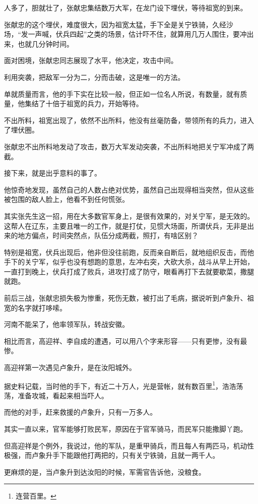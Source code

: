 \begin{multicols}{\theparacolNo}
		人多了，胆就壮了，张献忠集结数万大军，在龙门设下埋伏，等待祖宽的到来。

		张献忠的这个埋伏，难度很大，因为祖宽太猛，手下全是关宁铁骑，久经沙场，“发一声喊，伏兵四起”之类的场景，估计吓不住，就算用几万人围住，要冲出来，也就几分钟时间。

		面对困境，张献忠同志展现了水平，他决定，攻击中间。

		利用突袭，把敌军一分为二，分而击破，这是唯一的方法。

		单就质量而言，他的手下实在比较一般，但正如一位名人所说，有数量，就有质量，他集结了十倍于祖宽的兵力，开始等待。

		不出所料，祖宽出现了，依然不出所料，他没有丝毫防备，带领所有的兵力，进入了埋伏圈。

		张献忠不出所料地发动了攻击，数万大军发动突袭，不出所料地把关宁军冲成了两截。

		接下来，就是出乎意料的事了。

		他惊奇地发现，虽然自己的人数占绝对优势，虽然自己出现得相当突然，但从这些被包围的敌人脸上，他看不到任何慌张。

		其实张先生这一招，用在大多数官军身上，是很有效果的，对关宁军，是无效的。这帮人在辽东，主要且唯一的工作，就是打仗，见惯大场面，所谓伏兵，无非是出来的地方偏点，时间突然点，队伍分成两截，照打，有啥区别？

		特别是祖宽，伏兵出现后，他非但没往前跑，反而亲自断后，就地组织反击，而他手下的关宁军，似乎也没有想跑的意思，左冲右突，大砍大杀，战斗从早上开始，一直打到晚上，伏兵打成了败兵，进攻打成了防守，眼看再打下去就要歇菜，撒腿就跑。

		前后三战，张献忠损失极为惨重，死伤无数，被打出了毛病，据说听到卢象升、祖宽的名字就打哆嗦。

		河南不能呆了，他率领军队，转战安徽。

		相比而言，高迎祥、李自成的遭遇，可以用八个字来形容——只有更惨，没有最惨。

		高迎祥第一次遇见卢象升，是在汝阳城外。

		据史料记载，当时他的手下，有近二十万人，光是营帐，就有数百里\footnote{连营百里。}，浩浩荡荡，准备攻城，看起来相当吓人。

		而他的对手，赶来救援的卢象升，只有一万多人。

		其实一直以来，官军能够打败民军，原因在于官军骑马，而民军只能撒脚丫跑。

		但高迎祥是个例外，我说过，他的军队，是重甲骑兵，而且每人有两匹马，机动性极强，而卢象升手下能跟他打两把的，只有关宁铁骑，且就一两千人。

		更麻烦的是，当卢象升到达汝阳的时候，军需官告诉他，没粮食。


\end{multicols}
